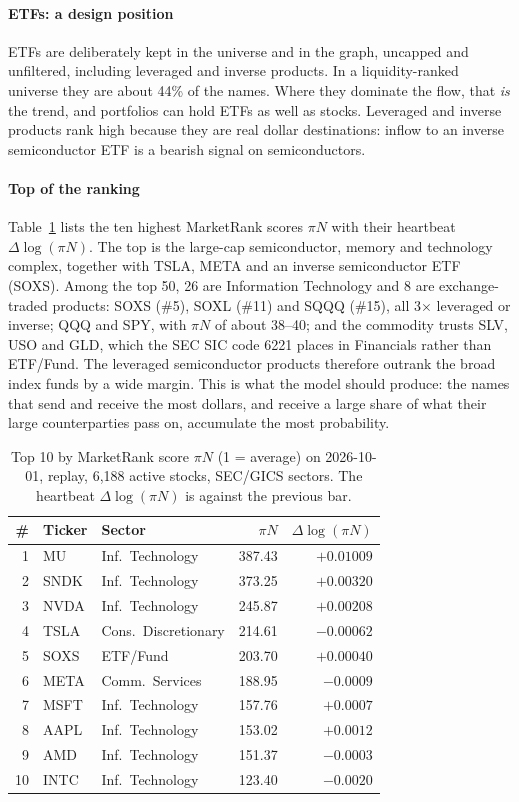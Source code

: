 \documentclass[preprint,3p,twocolumn]{elsarticle}
\begin{document}
\paragraph{ETFs: a design position}
\label{Section:etf}
ETFs are deliberately kept in the universe and in the graph, uncapped and unfiltered, including leveraged and inverse products. In a liquidity-ranked universe they are about 44\% of the names. Where they dominate the flow, that \emph{is} the trend, and portfolios can hold ETFs as well as stocks. Leveraged and inverse products rank high because they are real dollar destinations: inflow to an inverse semiconductor ETF is a bearish signal on semiconductors.

\paragraph{Top of the ranking} Table~\ref{Table:top} lists the ten highest MarketRank scores $\pi N$ with their heartbeat $\Delta\log(\pi N)$. The top is the large-cap semiconductor, memory and technology complex, together with TSLA, META and an inverse semiconductor ETF (SOXS). Among the top 50, 26 are Information Technology and 8 are exchange-traded products: SOXS (\#5), SOXL (\#11) and SQQQ (\#15), all 3$\times$ leveraged or inverse; QQQ and SPY, with $\pi N$ of about 38--40; and the commodity trusts SLV, USO and GLD, which the SEC SIC code 6221 places in Financials rather than ETF/Fund. The leveraged semiconductor products therefore outrank the broad index funds by a wide margin. This is what the model should produce: the names that send and receive the most dollars, and receive a large share of what their large counterparties pass on, accumulate the most probability.

\begin{table}[t]
\centering
\caption{Top 10 by MarketRank score $\pi N$ (1 = average) on 2026-10-01, replay, 6,188 active stocks, SEC/GICS sectors. The heartbeat $\Delta\log(\pi N)$ is against the previous bar.}
\label{Table:top}
\small\setlength{\tabcolsep}{3.5pt}
\begin{tabular}{rllrr}
\toprule
\# & Ticker & Sector & $\pi N$ & $\Delta\log(\pi N)$\\
\midrule
1 & MU & Inf.\ Technology & 387.43 & $+0.01009$\\
2 & SNDK & Inf.\ Technology & 373.25 & $+0.00320$\\
3 & NVDA & Inf.\ Technology & 245.87 & $+0.00208$\\
4 & TSLA & Cons.\ Discretionary & 214.61 & $-0.00062$\\
5 & SOXS & ETF/Fund & 203.70 & $+0.00040$\\
6 & META & Comm.\ Services & 188.95 & $-0.0009$\\
7 & MSFT & Inf.\ Technology & 157.76 & $+0.0007$\\
8 & AAPL & Inf.\ Technology & 153.02 & $+0.0012$\\
9 & AMD & Inf.\ Technology & 151.37 & $-0.0003$\\
10 & INTC & Inf.\ Technology & 123.40 & $-0.0020$\\
\bottomrule
\end{tabular}
\end{table}
\end{document}

